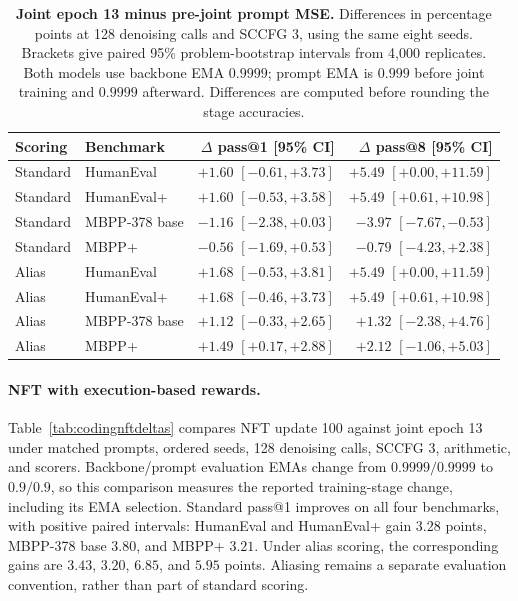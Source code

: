 \documentclass{article}
\begin{document}
\begin{table}[htbp]
\centering\small
\setlength{\tabcolsep}{4pt}
\caption{\textbf{Joint epoch 13 minus pre-joint prompt MSE.} Differences in percentage points at 128 denoising calls and SCCFG 3, using the same eight seeds. Brackets give paired 95\% problem-bootstrap intervals from 4,000 replicates. Both models use backbone EMA $0.9999$; prompt EMA is $0.999$ before joint training and $0.9999$ afterward. Differences are computed before rounding the stage accuracies.}
\label{tab:codingjointdeltas}
\begin{tabular}{@{}llrr@{}}
\toprule
Scoring & Benchmark & $\Delta$ pass@1 [95\% CI] & $\Delta$ pass@8 [95\% CI]\\
\midrule
Standard & HumanEval & $+1.60$ {\scriptsize $[-0.61,+3.73]$} & $+5.49$ {\scriptsize $[+0.00,+11.59]$}\\
Standard & HumanEval+ & $+1.60$ {\scriptsize $[-0.53,+3.58]$} & $+5.49$ {\scriptsize $[+0.61,+10.98]$}\\
Standard & MBPP-378 base & $-1.16$ {\scriptsize $[-2.38,+0.03]$} & $-3.97$ {\scriptsize $[-7.67,-0.53]$}\\
Standard & MBPP+ & $-0.56$ {\scriptsize $[-1.69,+0.53]$} & $-0.79$ {\scriptsize $[-4.23,+2.38]$}\\
\midrule
Alias & HumanEval & $+1.68$ {\scriptsize $[-0.53,+3.81]$} & $+5.49$ {\scriptsize $[+0.00,+11.59]$}\\
Alias & HumanEval+ & $+1.68$ {\scriptsize $[-0.46,+3.73]$} & $+5.49$ {\scriptsize $[+0.61,+10.98]$}\\
Alias & MBPP-378 base & $+1.12$ {\scriptsize $[-0.33,+2.65]$} & $+1.32$ {\scriptsize $[-2.38,+4.76]$}\\
Alias & MBPP+ & $+1.49$ {\scriptsize $[+0.17,+2.88]$} & $+2.12$ {\scriptsize $[-1.06,+5.03]$}\\
\bottomrule
\end{tabular}
\end{table}

\paragraph{NFT with execution-based rewards.}
Table~\ref{tab:codingnftdeltas} compares NFT update 100 against joint epoch 13 under matched prompts, ordered seeds, 128 denoising calls, SCCFG 3, arithmetic, and scorers. Backbone/prompt evaluation EMAs change from $0.9999/0.9999$ to $0.9/0.9$, so this comparison measures the reported training-stage change, including its EMA selection. Standard pass@1 improves on all four benchmarks, with positive paired intervals: HumanEval and HumanEval+ gain $3.28$ points, MBPP-378 base $3.80$, and MBPP+ $3.21$. Under alias scoring, the corresponding gains are $3.43$, $3.20$, $6.85$, and $5.95$ points. Aliasing remains a separate evaluation convention, rather than part of standard scoring.
\end{document}
